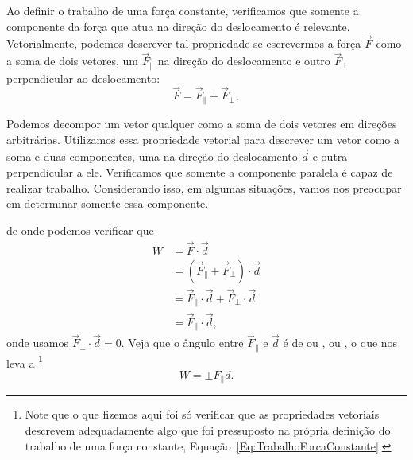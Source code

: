 Ao definir o trabalho de uma força constante, verificamos que somente a componente da força que atua na direção do deslocamento é relevante. Vetorialmente, podemos descrever tal propriedade se escrevermos a força $\vec{F}$ como a soma de dois vetores, um $\vec{F}_{\parallel}$ na direção do deslocamento e outro $\vec{F}_{\perp}$ perpendicular ao deslocamento:
\begin{equation}
    \vec{F} = \vec{F}_{\parallel} + \vec{F}_{\perp},
\end{equation}
%
\begin{marginfigure}[-2cm]
\centering
{}
\caption{Podemos decompor um vetor qualquer como a soma de dois vetores em direções arbitrárias. Utilizamos essa propriedade vetorial para descrever um vetor como a soma e duas componentes, uma na direção do deslocamento $\vec{d}$ e outra perpendicular a ele. Verificamos que somente a componente paralela é capaz de realizar trabalho. Considerando isso, em algumas situações, vamos nos preocupar em determinar somente essa componente.}
\end{marginfigure}
%
\noindent{}de onde podemos verificar que
\begin{align}
    W &= \vec{F}\cdot\vec{d} \\
    &= (\vec{F}_{\parallel} + \vec{F}_{\perp})\cdot\vec{d} \\
    &= \vec{F}_{\parallel} \cdot \vec{d} + \vec{F}_{\perp} \cdot \vec{d} \\
    &= \vec{F}_{\parallel} \cdot \vec{d},
\end{align}
%
onde usamos $\vec{F}_{\perp} \cdot \vec{d} = 0$. Veja que o ângulo entre $\vec{F}_{\parallel}$ e $\vec{d}$ é de ou , ou , o que nos leva a \footnote{Note que o que fizemos aqui foi só verificar que as propriedades vetoriais descrevem adequadamente algo que foi pressuposto na própria definição do trabalho de uma força constante, Equação~\ref{Eq:TrabalhoForcaConstante}.}
\begin{equation}\label{eq:TrabalhoDecompForca}
    W = \pm F_{\parallel} d.
\end{equation}

